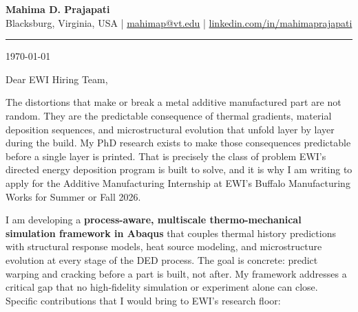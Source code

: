 \documentclass[11pt, a4paper]{article}
\begin{document}
\begin{center}
    {\LARGE \textbf{Mahima D. Prajapati}}\\[4pt]
    Blacksburg, Virginia, USA \quad|\quad
    \href{mailto:mahimap@vt.edu}{mahimap@vt.edu} \quad|\quad
    \href{https://linkedin.com/in/mahimaprajapati}{linkedin.com/in/mahimaprajapati}
\end{center}

\vspace{8pt}
\hrule
\vspace{16pt}

\today

\vspace{16pt}

Dear EWI Hiring Team,

The distortions that make or break a metal additive manufactured part are not random. They are the predictable consequence of thermal gradients, material deposition sequences, and microstructural evolution that unfold layer by layer during the build. My PhD research exists to make those consequences predictable before a single layer is printed. That is precisely the class of problem EWI's directed energy deposition program is built to solve, and it is why I am writing to apply for the Additive Manufacturing Internship at EWI's Buffalo Manufacturing Works for Summer or Fall 2026.

I am developing a \textbf{process-aware, multiscale thermo-mechanical simulation framework in Abaqus} that couples thermal history predictions with structural response models, heat source modeling, and microstructure evolution at every stage of the DED process. The goal is concrete: predict warping and cracking before a part is built, not after. My framework addresses a critical gap that no high-fidelity simulation or experiment alone can close. Specific contributions that I would bring to EWI's research floor:
\end{document}
